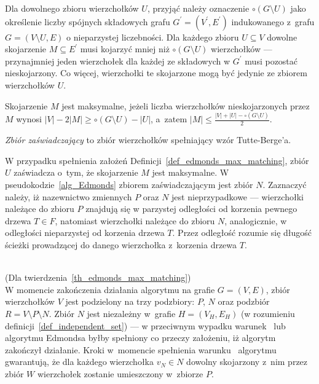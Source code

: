 {  Dla dowolnego zbioru wierzchołków $U$, przyjąć należy oznaczenie $\circ (G \setminus U)$ jako określenie liczby spójnych składowych grafu $G^\prime=(V^\prime, E^\prime)$ indukowanego z~grafu $G=(V \setminus U, E)$ o nieparzystej liczebności.
  Dla każdego zbioru $U \subseteq V$ dowolne skojarzenie $M \subseteq E^\prime$ musi kojarzyć mniej niż $\circ (G \setminus U)$ wierzchołków --- przynajmniej jeden wierzchołek dla każdej ze składowych w $G^\prime$ musi pozostać nieskojarzony.
  Co więcej, wierzchołki te skojarzone mogą być jedynie ze zbiorem wierzchołków $U$.
  \begin{definition}
    Skojarzenie $M$ jest maksymalne, jeżeli liczba wierzchołków nieskojarzonych przez $M$ wynosi $|V| - 2|M| \geq \circ (G \setminus U) - |U|$, a~zatem $|M|\leq \frac{|V|+|U| - \circ (G \setminus U)}{2}$.
  \end{definition}
  \begin{definition}
  \emph{Zbiór zaświadczający} to zbiór wierzchołków spełniający wzór Tutte-Berge'a.
  \end{definition}
  W przypadku spełnienia założeń Definicji~\ref{def_edmonds_max_matching}, zbiór $U$ zaświadcza o~tym, że skojarzenie $M$ jest maksymalne.
  W pseudokodzie~\ref{alg_Edmonds} zbiorem zaświadczającym jest zbiór $N$.
  Zaznaczyć należy, iż nazewnictwo zmiennych $P$ oraz $N$ jest nieprzypadkowe --- wierzchołki należące do zbioru $P$ znajdują się w parzystej odległości od korzenia pewnego drzewa $T \in F$, natomiast wierzchołki należące do zbioru $N$, analogicznie, w odległości nieparzystej od korzenia drzewa $T$.
  Przez odległość rozumie się długość ścieżki prowadzącej do danego wierzchołka z~korzenia drzewa $T$.\\\\
  \begin{bproof} (Dla twierdzenia~\ref{th_edmonds_max_matching})\\
    W momencie zakończenia działania algorytmu na grafie $G=(V, E)$, zbiór wierzchołków $V$ jest podzielony na trzy podzbiory: $P$, $N$ oraz podzbiór $R = V \setminus P \setminus N$.
    Zbiór $N$ jest niezależny w~grafie $H=(V_H, E_H)$ (w rozumieniu definicji~\ref{def_independent_set}) --- w przeciwnym wypadku warunek~ lub~ algorytmu Edmondsa byłby spełniony co przeczy założeniu, iż algorytm zakończył działanie.
    Kroki w~momencie spełnienia warunku~ algorytmu gwarantują, że dla każdego wierzchołka $v_N \in N$ dowolny skojarzony z~nim przez zbiór $W$ wierzchołek zostanie umieszczony w~zbiorze $P$.

\end{bproof}}
